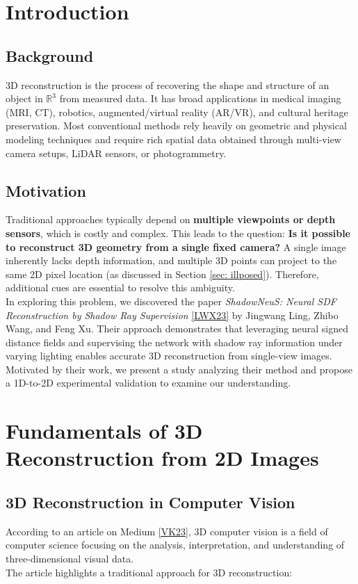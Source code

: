\documentclass[12pt,a4paper]{article}
\theoremstyle{definition}
\begin{document}
\section{Introduction}
\subsection{Background}
3D reconstruction is the process of recovering the shape and structure of an object in \(\mathbb{R}^3\) from measured data. It has broad applications in medical imaging (MRI, CT), robotics, augmented/virtual reality (AR/VR), and cultural heritage preservation. Most conventional methods rely heavily on geometric and physical modeling techniques and require rich spatial data obtained through multi-view camera setups, LiDAR sensors, or photogrammetry.

\subsection{Motivation}
Traditional approaches typically depend on \textbf{multiple viewpoints or depth sensors}, which is costly and complex. This leads to the question: \textbf{Is it possible to reconstruct 3D geometry from a single fixed camera?} A single image inherently lacks depth information, and multiple 3D points can project to the same 2D pixel location (as discussed in Section \ref{sec: illposed}). Therefore, additional cues are essential to resolve this ambiguity. \\
In exploring this problem, we discovered the paper \textit{ShadowNeuS: Neural SDF Reconstruction by Shadow Ray Supervision} \hyperlink{[LWX23]}{[LWX23]} by Jingwang Ling, Zhibo Wang, and Feng Xu. Their approach demonstrates that leveraging neural signed distance fields and supervising the network with shadow ray information under varying lighting enables accurate 3D reconstruction from single-view images. Motivated by their work, we present a study analyzing their method and propose a 1D-to-2D experimental validation to examine our understanding.

\section{Fundamentals of 3D Reconstruction from 2D Images}
\subsection{3D Reconstruction in Computer Vision}
According to an article on Medium \hyperlink{[VK23]}{[VK23]}, 3D computer vision is a field of computer science focusing on the analysis, interpretation, and understanding of three-dimensional visual data. \\
The article highlights a traditional approach for 3D reconstruction:
\end{document}
